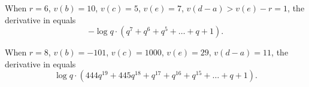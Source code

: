 \begin{example}
  When $r = 6$, $v(b) = 10$, $v(c) = 5$, $v(e) = 7$, $v(d-a) > v(e)-r = 1$,
  the derivative in  equals
  \[ -\log q \cdot (q^7 + q^6 + q^5 + \dots + q + 1). \]
\end{example}

\begin{example}
  When $r = 8$, $v(b) = -101$, $v(c) = 1000$, $v(e) = 29$, $v(d-a) = 11$,
  the derivative in  equals
  \[ \log q \cdot (444 q^{19} + 445q^{18} + q^{17} + q^{16} + q^{15} + \dots + q + 1). \]
\end{example}
